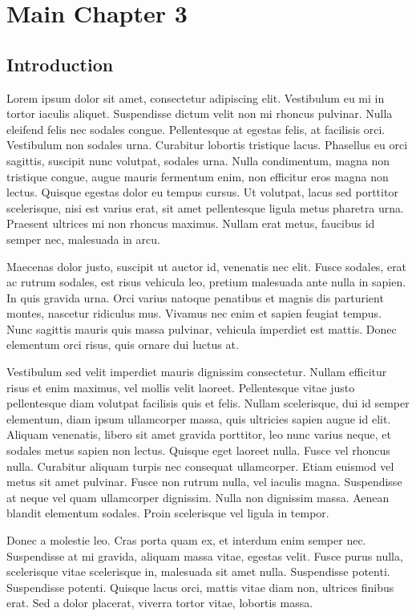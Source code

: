 \chapter{Main Chapter 3}
\label{chap:Main_3}
\section{Introduction}
\label{sec:Main_3_Intro}
Lorem ipsum dolor sit amet, consectetur adipiscing elit. Vestibulum eu mi in tortor iaculis aliquet. Suspendisse dictum velit non mi rhoncus pulvinar. Nulla eleifend felis nec sodales congue. Pellentesque at egestas felis, at facilisis orci. Vestibulum non sodales urna. Curabitur lobortis tristique lacus. Phasellus eu orci sagittis, suscipit nunc volutpat, sodales urna. Nulla condimentum, magna non tristique congue, augue mauris fermentum enim, non efficitur eros magna non lectus. Quisque egestas dolor eu tempus cursus. Ut volutpat, lacus sed porttitor scelerisque, nisi est varius erat, sit amet pellentesque ligula metus pharetra urna. Praesent ultrices mi non rhoncus maximus. Nullam erat metus, faucibus id semper nec, malesuada in arcu.

Maecenas dolor justo, suscipit ut auctor id, venenatis nec elit. Fusce sodales, erat ac rutrum sodales, est risus vehicula leo, pretium malesuada ante nulla in sapien. In quis gravida urna. Orci varius natoque penatibus et magnis dis parturient montes, nascetur ridiculus mus. Vivamus nec enim et sapien feugiat tempus. Nunc sagittis mauris quis massa pulvinar, vehicula imperdiet est mattis. Donec elementum orci risus, quis ornare dui luctus at.

Vestibulum sed velit imperdiet mauris dignissim consectetur. Nullam efficitur risus et enim maximus, vel mollis velit laoreet. Pellentesque vitae justo pellentesque diam volutpat facilisis quis et felis. Nullam scelerisque, dui id semper elementum, diam ipsum ullamcorper massa, quis ultricies sapien augue id elit. Aliquam venenatis, libero sit amet gravida porttitor, leo nunc varius neque, et sodales metus sapien non lectus. Quisque eget laoreet nulla. Fusce vel rhoncus nulla. Curabitur aliquam turpis nec consequat ullamcorper. Etiam euismod vel metus sit amet pulvinar. Fusce non rutrum nulla, vel iaculis magna. Suspendisse at neque vel quam ullamcorper dignissim. Nulla non dignissim massa. Aenean blandit elementum sodales. Proin scelerisque vel ligula in tempor.

Donec a molestie leo. Cras porta quam ex, et interdum enim semper nec. Suspendisse at mi gravida, aliquam massa vitae, egestas velit. Fusce purus nulla, scelerisque vitae scelerisque in, malesuada sit amet nulla. Suspendisse potenti. Suspendisse potenti. Quisque lacus orci, mattis vitae diam non, ultrices finibus erat. Sed a dolor placerat, viverra tortor vitae, lobortis massa.

